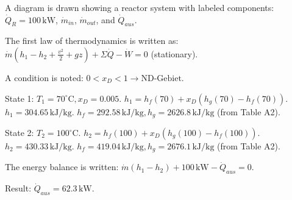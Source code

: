 A diagram is drawn showing a reactor system with labeled components: \( \dot{Q}_R = 100 \, \text{kW} \), \( \dot{m}_{in} \), \( \dot{m}_{out} \), and \( \dot{Q}_{aus} \).  

The first law of thermodynamics is written as:  
\( \dot{m} (h_1 - h_2 + \frac{v^2}{2} + g z) + \Sigma \dot{Q} - \dot{W} = 0 \) (stationary).  

A condition is noted:  
\( 0 < x_D < 1 \rightarrow \text{ND-Gebiet} \).  

State 1: \( T_1 = 70^\circ \text{C}, x_D = 0.005 \).  
\( h_1 = h_f(70) + x_D (h_g(70) - h_f(70)) \).  
\( h_1 = 304.65 \, \text{kJ/kg} \).  
\( h_f = 292.58 \, \text{kJ/kg}, h_g = 2626.8 \, \text{kJ/kg} \) (from Table A2).  

State 2: \( T_2 = 100^\circ \text{C} \).  
\( h_2 = h_f(100) + x_D (h_g(100) - h_f(100)) \).  
\( h_2 = 430.33 \, \text{kJ/kg} \).  
\( h_f = 419.04 \, \text{kJ/kg}, h_g = 2676.1 \, \text{kJ/kg} \) (from Table A2).  

The energy balance is written:  
\( \dot{m} (h_1 - h_2) + 100 \, \text{kW} - \dot{Q}_{aus} = 0 \).  

Result:  
\( \dot{Q}_{aus} = 62.3 \, \text{kW} \).